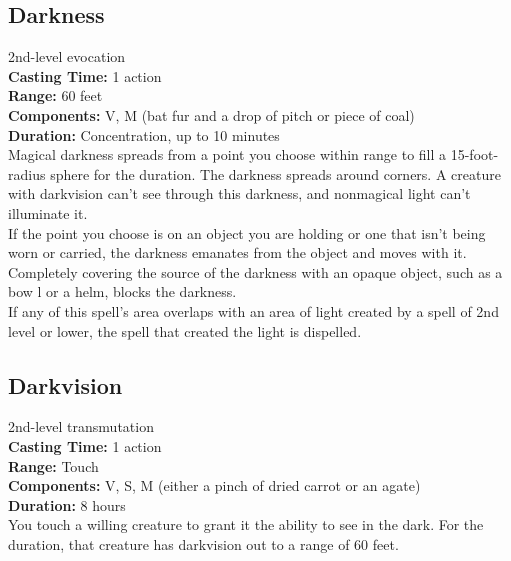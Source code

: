 \documentclass[11pt, A4paper, english]{article}
\begin{document}
		\subsection{Darkness}
2nd-level evocation \\
\textbf{Casting Time:} 1 action \\
\textbf{Range:} 60 feet \\
\textbf{Components:} V, M (bat fur and a drop of pitch or piece of coal) \\
\textbf{Duration:} Concentration, up to 10 minutes \\
Magical darkness spreads from a point you choose within range to fill a 15-foot-radius sphere for the duration. The darkness spreads around corners. A creature with darkvision can't see through this darkness, and nonmagical light can't illuminate it. \\
If the point you choose is on an object you are holding or one that isn't being worn or carried, the darkness emanates from the object and moves with it. Completely covering the source of the darkness with an opaque object, such as a bow l or a helm, blocks the darkness. \\
If any of this spell’s area overlaps with an area of light created by a spell of 2nd level or lower, the spell that created the light is dispelled.

		\subsection{Darkvision}
2nd-level transmutation \\
\textbf{Casting Time:} 1 action \\
\textbf{Range:} Touch \\
\textbf{Components:} V, S, M (either a pinch of dried carrot or an agate) \\
\textbf{Duration:} 8 hours \\
You touch a willing creature to grant it the ability to see in the dark. For the duration, that creature has darkvision out to a range of 60 feet.
\end{document}
